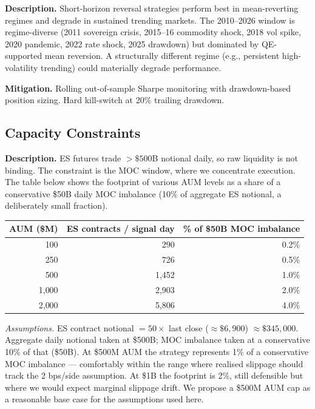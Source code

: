 \documentclass[11pt]{article}
\begin{document}
\textbf{Description.} Short-horizon reversal strategies perform best in
mean-reverting regimes and degrade in sustained trending markets. The
2010--2026 window is regime-diverse (2011 sovereign crisis, 2015--16
commodity shock, 2018 vol spike, 2020 pandemic, 2022 rate shock, 2025
drawdown) but dominated by QE-supported mean reversion. A structurally
different regime (e.g., persistent high-volatility trending) could
materially degrade performance.

\textbf{Mitigation.} Rolling out-of-sample Sharpe monitoring with
drawdown-based position sizing. Hard kill-switch at 20\% trailing drawdown.

\subsection{Capacity Constraints}

\textbf{Description.} ES futures trade $> \$500$B notional daily, so raw
liquidity is not binding. The constraint is the MOC window, where we
concentrate execution. The table below shows the footprint of various AUM
levels as a share of a conservative \$50B daily MOC imbalance
(10\% of aggregate ES notional, a deliberately small fraction).

\begin{center}
\small
\begin{tabular}{r r r}
\toprule
\textbf{AUM (\$M)} & \textbf{ES contracts / signal day} & \textbf{\% of \$50B MOC imbalance}\\
\midrule
100   & 290    & 0.2\%\\
250   & 726    & 0.5\%\\
500   & 1{,}452 & 1.0\%\\
1{,}000 & 2{,}903 & 2.0\%\\
2{,}000 & 5{,}806 & 4.0\%\\
\bottomrule
\end{tabular}
\end{center}

\textit{Assumptions.} ES contract notional $= 50 \times$ last close
($\approx \$6{,}900$) $\approx \$345{,}000$. Aggregate daily notional
taken at \$500B; MOC imbalance taken at a conservative 10\% of that
(\$50B). At \$500M AUM the strategy represents 1\% of a conservative MOC
imbalance --- comfortably within the range where realised slippage should
track the 2 bps/side assumption. At \$1B the footprint is 2\%, still
defensible but where we would expect marginal slippage drift. We propose a
\$500M AUM cap as a reasonable base case for the assumptions used here.
\end{document}
